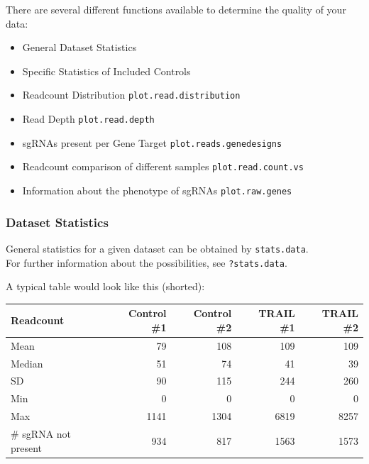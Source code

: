 \documentclass[]{article}
\providecommand{\tightlist}{%
  \setlength{\itemsep}{0pt}\setlength{\parskip}{0pt}}
\begin{document}
There are several different functions available to determine the quality
of your data:

\begin{itemize}
\tightlist
\item
  General Dataset Statistics
\item
  Specific Statistics of Included Controls
\item
  Readcount Distribution \texttt{plot.read.distribution}
\item
  Read Depth \texttt{plot.read.depth}
\item
  sgRNAs present per Gene Target \texttt{plot.reads.genedesigns}
\item
  Readcount comparison of different samples \texttt{plot.read.count.vs}
\item
  Information about the phenotype of sgRNAs \texttt{plot.raw.genes}
\end{itemize}

\subsubsection{Dataset Statistics}\label{dataset-statistics}

General statistics for a given dataset can be obtained by
\texttt{stats.data}.\\
For further information about the possibilities, see
\texttt{?stats.data}.

A typical table would look like this (shorted):

\begin{longtable}[c]{@{}lrrrr@{}}
\toprule
Readcount & Control \#1 & Control \#2 & TRAIL \#1 & TRAIL
\#2\tabularnewline
\midrule
\endhead
Mean & 79 & 108 & 109 & 109\tabularnewline
Median & 51 & 74 & 41 & 39\tabularnewline
SD & 90 & 115 & 244 & 260\tabularnewline
Min & 0 & 0 & 0 & 0\tabularnewline
Max & 1141 & 1304 & 6819 & 8257\tabularnewline
\# sgRNA not present & 934 & 817 & 1563 & 1573\tabularnewline
\bottomrule
\end{longtable}
\end{document}

